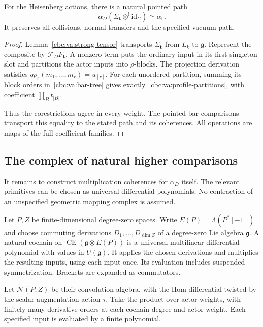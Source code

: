 \begin{proposition}\label{cbc:va:profile-comparison}
For the Heisenberg actions, there is a natural
pointed path
\[
 \alpha_D(\Sigma_{\mathbf t}\otimes^!\mathrm{id}_C)
                        \simeq\alpha_{\mathbf t}.
\]
It preserves all collisions, normal transfers
and the specified vacuum path.
\end{proposition}
\begin{proof}
Lemma~\ref{cbc:va:strong-tensor} transports
$\Sigma_{\mathbf t}$ from $L_k$ to $\mathfrak g$.
Represent the composite by
$\mathcal F_DF_{\mathbf t}$.
A nonzero term puts the ordinary input in
its first singleton slot and partitions the
actor inputs into $\rho$-blocks.
The projection derivation satisfies
$q\rho_r(m_1,\ldots,m_r)=u_{[r]}$.
For each unordered partition, summing its
block orders in~\eqref{cbc:va:bar-tree} gives
exactly~\eqref{cbc:va:profile-partitions}, with
coefficient $\prod_Bt_{|B|}$.

Thus the corestrictions agree in every weight.
The pointed bar comparisons transport this
equality to the stated path and its coherences.
All operations are maps of the full coefficient
families.
\end{proof}

\subsection{The complex of natural higher comparisons}

It remains to construct multiplication coherences
for $\alpha_D$ itself. The relevant primitives
can be chosen as universal differential
polynomials. No contraction of an unspecified
geometric mapping complex is assumed.

Let $P,Z$ be finite-dimensional degree-zero
spaces. Write $E(P)=\Lambda(P^*[-1])$ and
choose commuting derivations $D_1,\ldots,D_{\dim Z}$
of a degree-zero Lie algebra $\mathfrak g$.
A natural cochain on
$\operatorname{CE}(\mathfrak g\otimes E(P))$
is a universal multilinear differential polynomial
with values in $U(\mathfrak g)$.
It applies the chosen derivations and multiplies
the resulting inputs, using each input once. Its evaluation
includes suspended symmetrization.
Brackets are expanded as commutators.

Let $\mathcal N(P;Z)$ be their convolution
algebra, with the Hom differential twisted by
the scalar augmentation action $\tau$.
Take the product over actor weights, with
finitely many derivative orders at each
cochain degree and actor weight.
Each specified input is evaluated by a
finite polynomial.

